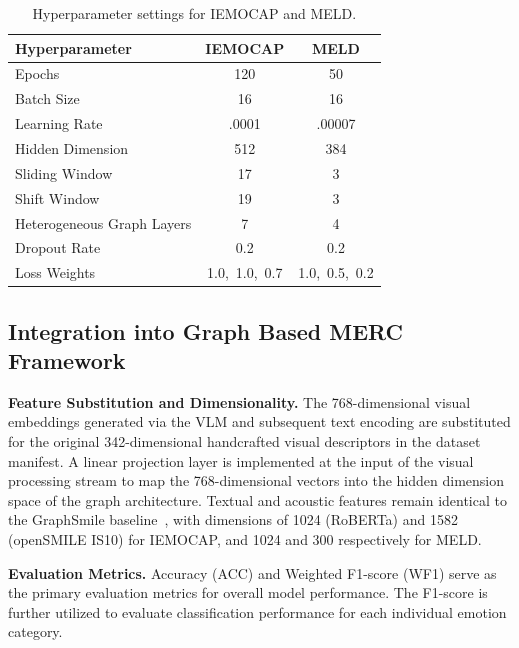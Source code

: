 \documentclass[runningheads]{llncs}
\begin{document}
\begin{table}[tb]
  \centering
  \caption{Hyperparameter settings for IEMOCAP and MELD.}
  \label{tab:hyperparams}
  \begin{tabular}{lcc}
    \hline
    \textbf{Hyperparameter}    & \textbf{IEMOCAP} & \textbf{MELD}    \\
    \hline
    Epochs                     & 120              & 50               \\
    Batch Size                 & 16               & 16               \\
    Learning Rate              & .0001 & .00007 \\
    Hidden Dimension           & 512              & 384              \\
    Sliding Window             & 17               & 3                \\
    Shift Window               & 19               & 3                \\
    Heterogeneous Graph Layers & 7                & 4                \\
    Dropout Rate               & 0.2              & 0.2              \\
    Loss Weights               & 1.0,~1.0,~0.7    & 1.0,~0.5,~0.2    \\
    \hline
  \end{tabular}
\end{table}

\subsection{Integration into Graph Based MERC Framework}

\noindent\textbf{Feature Substitution and Dimensionality.}
The 768-dimensional visual embeddings generated via the VLM and subsequent text encoding are substituted for the original 342-dimensional handcrafted visual descriptors in the dataset manifest. A linear projection layer is implemented at the input of the visual processing stream to map the 768-dimensional vectors into the hidden dimension space of the graph architecture. Textual and acoustic features remain identical to the GraphSmile baseline~\cite{li2024graphsmile}, with dimensions of 1024 (RoBERTa) and 1582 (openSMILE IS10) for IEMOCAP, and 1024 and 300 respectively for MELD.

\smallskip
\noindent\textbf{Evaluation Metrics.}
Accuracy (ACC) and Weighted F1-score (WF1) serve as the primary evaluation metrics for overall model performance. The F1-score is further utilized to evaluate classification performance for each individual emotion category.
\end{document}
